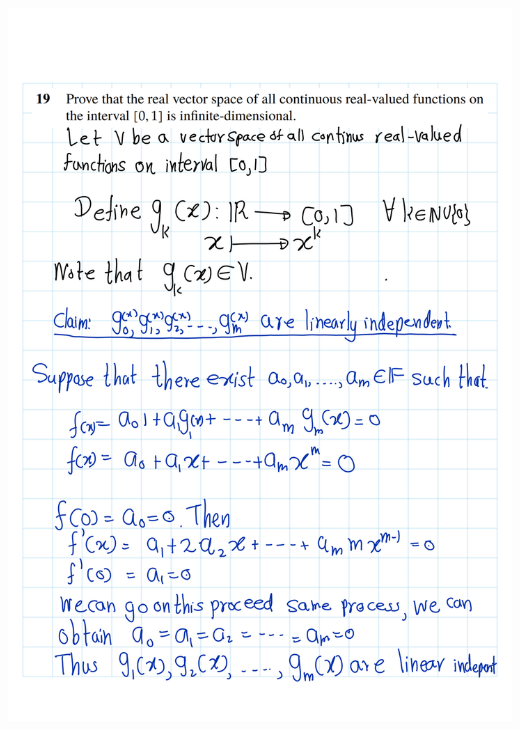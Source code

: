 \documentclass[
]{book}
\theoremstyle{definition}
\theoremstyle{definition}
\theoremstyle{definition}
\theoremstyle{definition}
\theoremstyle{remark}
\begin{document}
\includegraphics{fig/Ex2A/Ex2A-24.png}
\end{document}
